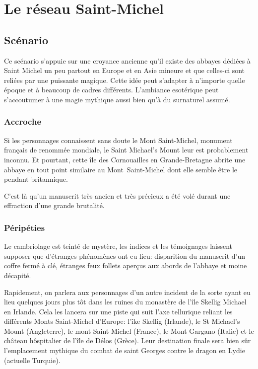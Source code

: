 \chapter{Le réseau Saint-Michel}

\section{Scénario}

Ce scénario s'appuie sur une croyance ancienne qu'il existe des abbayes dédiées à Saint Michel un peu partout en Europe et en Asie mineure et que celles-ci sont reliées par une puissante magique.
Cette idée peut s'adapter à n'importe quelle époque et à beaucoup de cadres différents.
L'ambiance esotérique peut s'accoutumer à une magie mythique aussi bien qu'à du surnaturel assumé.

\subsection{Accroche}

Si les personnages connaissent sans doute le Mont Saint-Michel, monument français de renommée mondiale, le Saint Michael's Mount leur est probablement inconnu. Et pourtant, cette île des Cornouailles en Grande-Bretagne abrite une abbaye en tout point similaire au Mont Saint-Michel dont elle semble être le pendant britannique.

C'est là qu'un manuscrit très ancien et très précieux a été volé durant une effraction d'une grande brutalité.

\subsection{Péripéties}

Le cambriolage est teinté de mystère, les indices et les témoignages laissent supposer que d'étranges phénomènes ont eu lieu: disparition du manuscrit d'un coffre fermé à clé, étranges feux follets aperçus aux abords de l'abbaye et moine décapité.

Rapidement, on parlera aux personnages d'un autre incident de la sorte ayant eu lieu quelques jours plus tôt dans les ruines du monastère de l'île Skellig Michael en Irlande.
Cela les lancera sur une piste qui suit l'axe tellurique reliant les différents Monts Saint-Michel d'Europe: l'îke Skellig (Irlande), le St Michael's Mount (Angleterre), le mont Saint-Michel (France), le Mont-Gargano (Italie) et le château hôspitalier de l'île de Délos (Grèce).
Leur destination finale sera bien sûr l'emplacement mythique du combat de saint Georges contre le dragon en Lydie (actuelle Turquie).

